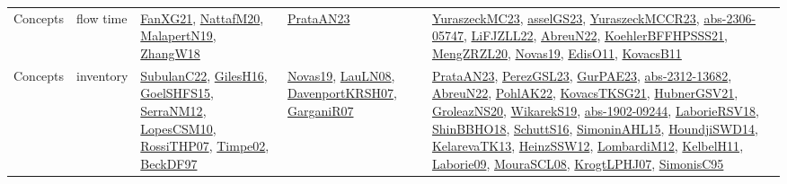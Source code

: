 {\begin{longtable}{llp{6cm}p{6cm}p{6cm}}
Concepts & flow time & \href{articles/FanXG21.pdf}{FanXG21}\cite{FanXG21}, \href{papers/NattafM20.pdf}{NattafM20}\cite{NattafM20}, \href{papers/MalapertN19.pdf}{MalapertN19}\cite{MalapertN19}, \href{articles/ZhangW18.pdf}{ZhangW18}\cite{ZhangW18} & \href{articles/PrataAN23.pdf}{PrataAN23}\cite{PrataAN23} & \href{papers/YuraszeckMC23.pdf}{YuraszeckMC23}\cite{YuraszeckMC23}, \href{papers/asselGS23.pdf}{asselGS23}\cite{asselGS23}, \href{articles/YuraszeckMCCR23.pdf}{YuraszeckMCCR23}\cite{YuraszeckMCCR23}, \href{articles/abs-2306-05747.pdf}{abs-2306-05747}\cite{abs-2306-05747}, \href{papers/LiFJZLL22.pdf}{LiFJZLL22}\cite{LiFJZLL22}, \href{articles/AbreuN22.pdf}{AbreuN22}\cite{AbreuN22}, \href{articles/KoehlerBFFHPSSS21.pdf}{KoehlerBFFHPSSS21}\cite{KoehlerBFFHPSSS21}, \href{articles/MengZRZL20.pdf}{MengZRZL20}\cite{MengZRZL20}, \href{articles/Novas19.pdf}{Novas19}\cite{Novas19}, \href{papers/EdisO11.pdf}{EdisO11}\cite{EdisO11}, \href{articles/KovacsB11.pdf}{KovacsB11}\cite{KovacsB11}\\
Concepts & inventory & \href{articles/SubulanC22.pdf}{SubulanC22}\cite{SubulanC22}, \href{papers/GilesH16.pdf}{GilesH16}\cite{GilesH16}, \href{articles/GoelSHFS15.pdf}{GoelSHFS15}\cite{GoelSHFS15}, \href{papers/SerraNM12.pdf}{SerraNM12}\cite{SerraNM12}, \href{articles/LopesCSM10.pdf}{LopesCSM10}\cite{LopesCSM10}, \href{papers/RossiTHP07.pdf}{RossiTHP07}\cite{RossiTHP07}, \href{articles/Timpe02.pdf}{Timpe02}\cite{Timpe02}, \href{papers/BeckDF97.pdf}{BeckDF97}\cite{BeckDF97} & \href{articles/Novas19.pdf}{Novas19}\cite{Novas19}, \href{papers/LauLN08.pdf}{LauLN08}\cite{LauLN08}, \href{papers/DavenportKRSH07.pdf}{DavenportKRSH07}\cite{DavenportKRSH07}, \href{papers/GarganiR07.pdf}{GarganiR07}\cite{GarganiR07} & \href{articles/PrataAN23.pdf}{PrataAN23}\cite{PrataAN23}, \href{papers/PerezGSL23.pdf}{PerezGSL23}\cite{PerezGSL23}, \href{articles/GurPAE23.pdf}{GurPAE23}\cite{GurPAE23}, \href{articles/abs-2312-13682.pdf}{abs-2312-13682}\cite{abs-2312-13682}, \href{articles/AbreuN22.pdf}{AbreuN22}\cite{AbreuN22}, \href{articles/PohlAK22.pdf}{PohlAK22}\cite{PohlAK22}, \href{papers/KovacsTKSG21.pdf}{KovacsTKSG21}\cite{KovacsTKSG21}, \href{articles/HubnerGSV21.pdf}{HubnerGSV21}\cite{HubnerGSV21}, \href{papers/GroleazNS20.pdf}{GroleazNS20}\cite{GroleazNS20}, \href{articles/WikarekS19.pdf}{WikarekS19}\cite{WikarekS19}, \href{articles/abs-1902-09244.pdf}{abs-1902-09244}\cite{abs-1902-09244}, \href{articles/LaborieRSV18.pdf}{LaborieRSV18}\cite{LaborieRSV18}, \href{articles/ShinBBHO18.pdf}{ShinBBHO18}\cite{ShinBBHO18}, \href{papers/SchuttS16.pdf}{SchuttS16}\cite{SchuttS16}, \href{articles/SimoninAHL15.pdf}{SimoninAHL15}\cite{SimoninAHL15}, \href{papers/HoundjiSWD14.pdf}{HoundjiSWD14}\cite{HoundjiSWD14}, \href{papers/KelarevaTK13.pdf}{KelarevaTK13}\cite{KelarevaTK13}, \href{articles/HeinzSSW12.pdf}{HeinzSSW12}\cite{HeinzSSW12}, \href{articles/LombardiM12.pdf}{LombardiM12}\cite{LombardiM12}, \href{articles/KelbelH11.pdf}{KelbelH11}\cite{KelbelH11}, \href{papers/Laborie09.pdf}{Laborie09}\cite{Laborie09}, \href{papers/MouraSCL08.pdf}{MouraSCL08}\cite{MouraSCL08}, \href{papers/KrogtLPHJ07.pdf}{KrogtLPHJ07}\cite{KrogtLPHJ07}, \href{papers/SimonisC95.pdf}{SimonisC95}\cite{SimonisC95}\\

\end{longtable}}
